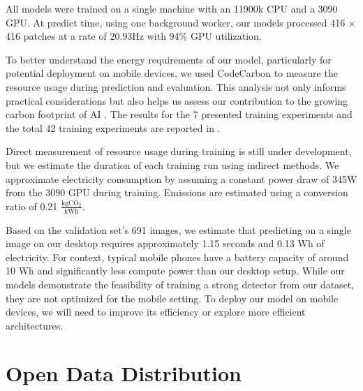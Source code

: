 \documentclass[10pt,twocolumn,letterpaper]{article}
\newcommand{\cotwo}{\ensuremath{\mathrm{CO_2}}}
\begin{document}
All models were trained on a single machine with an 11900k CPU and a 3090 GPU.
At predict time, using one background worker, our models processed 416 $\times$ 416 patches at a rate of
  20.93Hz with 94\% GPU utilization.

To better understand the energy requirements of our model, particularly for potential deployment on mobile
  devices, we used CodeCarbon \cite{lacoste2019codecarbon} to measure the resource usage during prediction and
  evaluation.
This analysis not only informs practical considerations but also helps us assess our contribution to the
  growing carbon footprint of AI \cite{kirkpatrick_carbon_2023}.
The results for the 7 presented training experiments and the total 42 training experiments are reported in
  .

Direct measurement of resource usage during training is still under development, but we estimate the
  duration of each training run using indirect methods.
We approximate electricity consumption by assuming a constant power draw of 345W from the 3090 GPU during
  training.
Emissions are estimated using a conversion ratio of 0.21 $\frac{\textrm{kg}\cotwo{}}{\textrm{kWh}}$.
% 
  
Based on the validation set's 691 images, we estimate that predicting on a single image on our desktop
  requires approximately 1.15 seconds and 0.13 Wh of electricity.
For context, typical mobile phones have a battery capacity of around 10 Wh and significantly less compute
  power than our desktop setup.
While our models demonstrate the feasibility of training a strong detector from our dataset, they are not
  optimized for the mobile setting.
To deploy our model on mobile devices, we will need to improve its efficiency or explore more efficient
  architectures.




\section{Open Data Distribution}
\label{sec:distribution}

  
\end{document}
